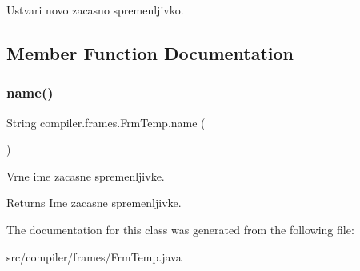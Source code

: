 Ustvari novo zacasno spremenljivko. 

\subsection{Member Function Documentation}
\mbox{\label{classcompiler_1_1frames_1_1_frm_temp_ae7e5fb79f467287ba99429b89572e575}} 
\subsubsection{\texorpdfstring{name()}{name()}}
{\footnotesize\ttfamily String compiler.\+frames.\+Frm\+Temp.\+name (\begin{DoxyParamCaption}{ }\end{DoxyParamCaption})}

Vrne ime zacasne spremenljivke.

\begin{DoxyReturn}{Returns}
Ime zacasne spremenljivke. 
\end{DoxyReturn}


The documentation for this class was generated from the following file\+:\begin{DoxyCompactItemize}
\item 
src/compiler/frames/Frm\+Temp.\+java\end{DoxyCompactItemize}
